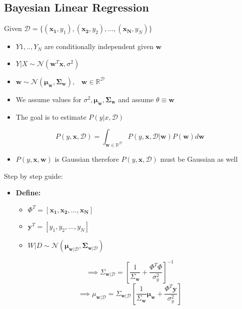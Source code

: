 \documentclass[12pt,a4paper]{article}
\begin{document}
\subsection{Bayesian Linear Regression}
Given $\mathcal{D} = \{(\mathbf{x_1}, y_1), (\mathbf{x_2}, y_2), \ldots, (\mathbf{x_N}, y_N)\}$
\begin{itemize}
    \item $Y1,.., Y_N$ are conditionally independent given $\mathbf{w}$
    \item $Y|X \sim \mathcal{N}(\mathbf{w}^T \mathbf{x}, \sigma^2)$
    \item $\mathbf{w} \sim \mathcal{N}(\mathbf{\mu}_\mathbf{w}, \mathbf{\Sigma}_{\mathbf{w}}), \hspace{10pt} \mathbf{w} \in \mathbb{R}^\mathcal{D}$
    \item We assume values for $\sigma^2, \mathbf{\mu}_\mathbf{w}, \mathbf{\Sigma}_{\mathbf{w}}$ and assume $\theta \equiv \mathbf{w}$
    \item The goal is to estimate $P(y|x, \mathcal{D})$
\end{itemize}

\[
P(y, \mathbf{x}, \mathcal{D}) = \int_{\mathbf{w} \in \mathbb{R}^\mathcal{D}}^{} P(y, \mathbf{x}, \mathcal{D} | \mathbf{w}) P(\mathbf{w}) d\mathbf{w}
\]
\begin{itemize}
    \item $P(y, \mathbf{x}, \mathbf{w})$ is Gaussian therefore $P(y, \mathbf{x}, \mathcal{D})$ must be Gaussian as well
\end{itemize}

Step by step guide:
\begin{itemize}
    \item \textbf{Define:} 
    \begin{itemize}
        \item $\Phi^T = [\mathbf{x_1}, \mathbf{x_2}, \ldots, \mathbf{x_N}]$
        \item $\mathbf{y}^T = [y_1, y_2, \ldots, y_N]$
        \item $W|D \sim \mathcal{N}(\mathbf{\mu}_{\mathbf{w}|\mathcal{D}}, \mathbf{\Sigma}_{\mathbf{w}|\mathcal{D}})$
    \end{itemize}
\end{itemize}

\[
\implies \Sigma_{\mathbf{w}|\mathcal{D}} = \left[ \frac{1}{\Sigma_{\mathbf{w}}} + \frac{\Phi^T \Phi}{\sigma_{y}^2}\right]^{-1}
\]
\[
\implies \mu_{\mathbf{w}|\mathcal{D}}= \Sigma_{\mathbf{w}|\mathcal{D}} \left[\frac{1}{\Sigma_{\mathbf{w}}} \mathbf{\mu}_{\mathbf{w}} + \frac{\Phi^T \mathbf{y}}{\sigma_{y}^2}\right]
\]
\end{document}
